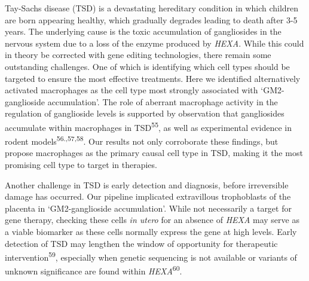 \documentclass[
]{article}
\begin{document}
Tay-Sachs disease (TSD) is a devastating hereditary condition in which
children are born appearing healthy, which gradually degrades leading to
death after 3-5 years. The underlying cause is the toxic accumulation of
gangliosides in the nervous system due to a loss of the enzyme produced
by \emph{HEXA}. While this could in theory be corrected with gene
editing technologies, there remain some outstanding challenges. One of
which is identifying which cell types should be targeted to ensure the
most effective treatments. Here we identified alternatively activated
macrophages as the cell type most strongly associated with
`GM2-ganglioside accumulation'. The role of aberrant macrophage activity
in the regulation of ganglioside levels is supported by observation that
gangliosides accumulate within macrophages in TSD\textsuperscript{55},
as well as experimental evidence in rodent
models\textsuperscript{56.,57,58}. Our results not only corroborate
these findings, but propose macrophages as the primary causal cell type
in TSD, making it the most promising cell type to target in therapies.

Another challenge in TSD is early detection and diagnosis, before
irreversible damage has occurred. Our pipeline implicated extravillous
trophoblasts of the placenta in `GM2-ganglioside accumulation'. While
not necessarily a target for gene therapy, checking these cells \emph{in
utero} for an absence of \emph{HEXA} may serve as a viable biomarker as
these cells normally express the gene at high levels. Early detection of
TSD may lengthen the window of opportunity for therapeutic
intervention\textsuperscript{59}, especially when genetic sequencing is
not available or variants of unknown significance are found within
\emph{HEXA}\textsuperscript{60}.
\end{document}
